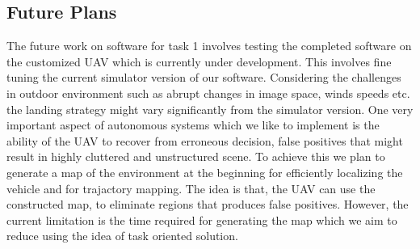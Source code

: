 \documentclass{standalone}
\begin{document}
\subsection{Future Plans}
The future work on software for task 1 involves testing the completed software on the customized UAV which is currently under development. This involves fine tuning the current simulator version of our software. Considering the challenges in outdoor environment such as abrupt changes in image space, winds speeds etc. the landing strategy might vary significantly from the simulator version. One very important aspect of autonomous systems which we like to implement is the ability of the UAV to recover from erroneous decision, false positives that might result in highly cluttered and unstructured scene. To achieve this we plan to generate a map of the environment at the beginning for efficiently localizing the vehicle and for trajactory mapping. The idea is that, the UAV can use the constructed map, to eliminate regions that produces false positives. However, the current limitation is the time required for generating the map which we aim to reduce using the idea of task oriented solution.

\end{document}
